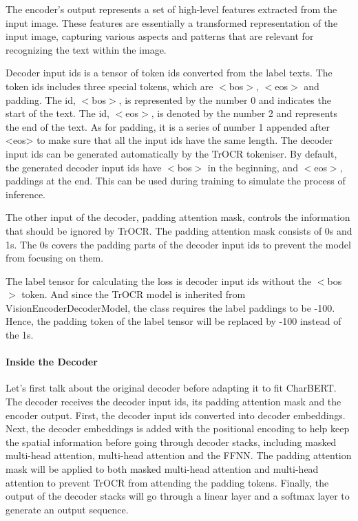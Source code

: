 The encoder's output represents a set of high-level features extracted from the input image. These features are essentially a transformed representation of the input image, capturing various aspects and patterns that are relevant for recognizing the text within the image.

Decoder input ids is a tensor of token ids converted from the label texts. The token ids includes three special tokens, which are $<$bos$>$, $<$eos$>$ and padding. The id, $<$bos$>$, is represented by the number 0 and indicates the start of the text. The id, $<$eos$>$, is denoted by the number 2 and represents the end of the text. As for padding, it is a series of number 1 appended after <eos> to make sure that all the input ids have the same length. The decoder input ids can be generated automatically by the TrOCR tokeniser. By default, the generated decoder input ids have $<$bos$>$ in the beginning, and $<$eos$>$, paddings at the end. This can be used during training to simulate the process of inference. 

The other input of the decoder, padding attention mask, controls the information that should be ignored by TrOCR. The padding attention mask consists of 0s and 1s. The 0s covers the padding parts of the decoder input ids to prevent the model from focusing on them.

The label tensor for calculating the loss is decoder input ids without the $<$bos$>$ token. And since the TrOCR model is inherited from VisionEncoderDecoderModel, the class requires the label paddings to be -100. Hence, the padding token of the label tensor will be replaced by -100 instead of the 1s.

\paragraph*{Inside the Decoder}
\label{par:3_inside_the_decoder}
Let's first talk about the original decoder before adapting it to fit CharBERT. The decoder receives the decoder input ids, its padding attention mask and the encoder output. First, the decoder input ids converted into decoder embeddings. Next, the decoder embeddings is added with the positional encoding to help keep the spatial information before going through decoder stacks, including masked multi-head attention, multi-head attention and the FFNN. The padding attention mask will be applied to both masked multi-head attention and multi-head attention to prevent TrOCR from attending the padding tokens. Finally, the output of the decoder stacks will go through a linear layer and a softmax layer to generate an output sequence. 

